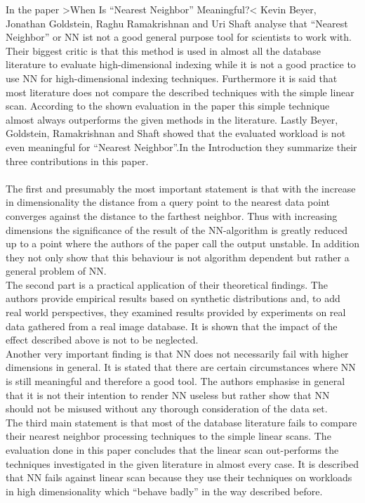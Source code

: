 \documentclass[a4paper,psfig,subfigure,epsfig,fleqn,amssmb,float,caption,fontenc,ausarbeitung]{article}
\begin{document}
In the paper >When Is “Nearest Neighbor” Meaningful?< Kevin Beyer, Jonathan Goldstein, Raghu Ramakrishnan and Uri Shaft analyse that “Nearest Neighbor” or NN ist not a good general purpose tool for scientists to work with. Their biggest critic is that this method is used in almost all the database literature to evaluate high-dimensional indexing while it is not a good practice to use NN for high-dimensional indexing techniques. Furthermore it is said that most literature does not compare the described techniques with the simple linear scan. According to the shown evaluation in the paper this simple technique almost always outperforms the given methods in the literature. Lastly Beyer, Goldstein, Ramakrishnan and Shaft showed that the evaluated workload is not even meaningful for “Nearest Neighbor”.In the Introduction they summarize their three contributions in this paper. 
\paragraph{}
The first and presumably the most important statement is that with the increase in dimensionality the distance from a query point to the nearest data point converges against the distance to the farthest neighbor. Thus with increasing dimensions the significance of the result of the NN-algorithm is greatly reduced up to a point where the authors of the paper call the output unstable. In addition they not only show that this behaviour is not algorithm dependent but rather a general problem of NN. \\
The second part is a practical application of their theoretical findings. The authors provide empirical results based on synthetic distributions and, to add real world perspectives, they examined results provided by experiments on real data gathered from a real image database. It is shown that the impact of the effect described above is not to be neglected. \\
Another very important finding is that NN does not necessarily fail with higher dimensions in general. It is stated that there are certain circumstances where NN is still meaningful and therefore a good tool. The authors emphasise in general that it is not their intention to render NN useless but rather show that NN should not be misused without any thorough consideration of the data set.\\
The third main statement is that most of the database literature fails to compare their nearest neighbor processing techniques to the simple linear scans. The evaluation done in this paper concludes that the linear scan out-performs the techniques investigated in the given literature in almost every case. It is described that NN fails against linear scan because they use their techniques on workloads  in high dimensionality which “behave badly” in the way described before.
\end{document}
